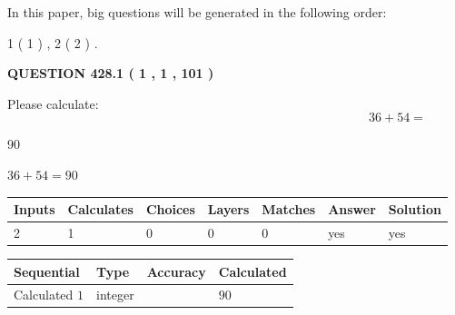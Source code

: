 \documentclass[12pt]{article}
\begin{document}
In this paper, big questions will be generated in the following order: 
   
   
   1 ( 1 )
 ,
   2 ( 2 )
 .
  
\vspace{0.2in}
  
{\textbf{\Large{QUESTION
428.1 
 ( 1 , 1 , 101 )
}}}
  
  
 
Please calculate:
\begin{equation}
36 +  %
54 = \nonumber
\end{equation}
 
 
 
\noindent{}
 
 

90
 
 
\noindent{}
 
 

 
 
 
\noindent{}
 
 

$ %
36 +  %
54=   %
90$
 
 
\noindent{}
 
 

 
   
   
   
   
\noindent\begin{tabular}{|l|l|l|l|l|l|l|}
 \hline
Inputs & Calculates & Choices & Layers & Matches & Answer & Solution \\ \hline
 2  & 
 1  & 
 0
  & 
 0  & 
 0  & 
  yes & 
  yes 
  \\ \hline
 \end{tabular}
   
   
   
   
\noindent{}
   
   
  
  
\noindent\begin{tabular}{|l|l|l|l|}
\hline
 Sequential & Type & Accuracy & Calculated \\ 
\hline
 
 
  Calculated $  1 $ & integer &  & 
  $ 90 $ 
 \\  \hline  
 \end{tabular}
   
\end{document}
